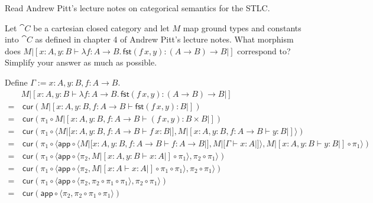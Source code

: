\def\pathToRoot{../../}

\usepackage{semantic}
\usepackage{todonotes}




\author{Joachim Bard}

\begin{hint}
    Read Andrew Pitt's lecture notes on categorical semantics for the STLC.
\end{hint}

\begin{exercise}
    Let $\cat{C}$ be a cartesian closed category and let $M$ map ground types and constants into $\cat{C}$ as defined in chapter 4 of Andrew Pitt's lecture notes.
    What morphism does $M |[x: A, y: B \vdash \lambda f: A \to B.\,\mathsf{fst}(f\,x, y) : (A \to B) \to B|]$ correspond to?
    Simplify your answer as much as possible.
\end{exercise}
\begin{answer}
    Define $\Gamma := x: A, y: B, f: A \to B$.
    \begin{align*}
          & M |[x: A, y: B \vdash \lambda f: A \to B.\,\mathsf{fst}(f\,x, y) : (A \to B) \to B|]\\
        = &\, \mathsf{cur}(M |[x: A, y: B,f: A \to B \vdash \mathsf{fst}(f\,x, y) : B|])\\
        = &\,\mathsf{cur}(\pi_1 \circ M|[x: A, y: B, f: A \to B \vdash (f\,x, y) : B \times B|])\\
        = &\, \mathsf{cur}(\pi_1 \circ \langle M|[x: A, y: B,f: A \to B \vdash f\,x : B|], M|[x: A, y: B,f: A \to B \vdash y: B|]\rangle)\\
        = &\, \mathsf{cur}(\pi_1 \circ \langle \mathsf{app} \circ \langle M|[x: A, y: B,f: A \to B \vdash f : A \to B|], M|[\Gamma \vdash x: A|]\rangle, M|[x: A, y: B \vdash y: B|] \circ \pi_1\rangle )\\
        = &\, \mathsf{cur}(\pi_1 \circ \langle \mathsf{app} \circ \langle\pi_2, M|[x:A, y:B \vdash x:A|] \circ \pi_1\rangle, \pi_2 \circ \pi_1\rangle)\\
        = &\, \mathsf{cur}(\pi_1 \circ \langle \mathsf{app} \circ \langle\pi_2, M|[x:A \vdash x:A|] \circ \pi_1 \circ \pi_1\rangle, \pi_2 \circ \pi_1\rangle)\\
        = &\, \mathsf{cur}(\pi_1 \circ \langle \mathsf{app} \circ \langle\pi_2, \pi_2 \circ \pi_1 \circ \pi_1\rangle, \pi_2 \circ \pi_1\rangle)\\
        = &\, \mathsf{cur}(\mathsf{app} \circ \langle \pi_2, \pi_2 \circ \pi_1 \circ \pi_1 \rangle)
    \end{align*}
\end{answer}

